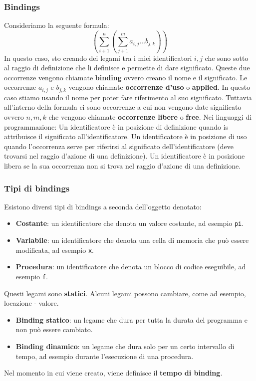 \documentclass[a4paper]{article}
\begin{document}
\subsubsection{Bindings}
Consideriamo la seguente formula:
\[
  \left(\sum_{i+1}^{n}\left(\sum_{j+1}^m a_{i,j} \dots b_{j,k}\right)\right)
\]
In questo caso, sto creando dei legami tra i miei identificatori
\( i, j \) che sono sotto al raggio di definizione che li definisce e 
permette di dare significato. Queste
due occorrenze vengono chiamate \textbf{binding} ovvero creano il nome
e il significato.
Le occorrenze $a_{i,j}$ e $b_{j,k}$ vengono chiamate \textbf{occorrenze 
d'uso} o \textbf{applied}. In questo caso stiamo usando il nome per 
poter fare riferimento al suo significato.
Tuttavia all'interno della formula ci sono occorrenze a cui non vengono date significato
ovvero $n,m,k$ che vengono chiamate \textbf{occorrenze libere} o \textbf{free}.
Nei linguaggi di programmazione:
{
  Un identificatore è in posizione di definizione quando
  is attribuisce il significato all'identificatore.
}
{
  Un identificatore è in posizione di uso quando
  l'occorrenza serve per riferirsi al significato dell'identificatore
  (deve trovarsi nel raggio d'azione di una definizione).
}
{
  Un identificatore è in posizione libera se
  la sua occorrenza non si trova nel raggio d'azione di una definizione.
}

\subsubsection{Tipi di bindings}

Esistono diversi tipi di bindings a seconda dell'oggetto denotato:
\begin{itemize}
  \item \textbf{Costante}: un identificatore che denota un valore costante, ad esempio \texttt{pi}.
  \item \textbf{Variabile}: un identificatore che denota una cella di memoria che può essere modificata, ad esempio \texttt{x}.
  \item \textbf{Procedura}: un identificatore che denota un blocco di codice eseguibile, ad esempio \texttt{f}.
\end{itemize}
Questi legami sono \textbf{statici}.
Alcuni legami possono cambiare, come ad esempio, locazione - valore. 
\begin{itemize}
  \item \textbf{Binding statico}: un legame che dura per tutta la durata del programma e non può essere cambiato.
  \item \textbf{Binding dinamico}: un legame che dura solo per un certo intervallo di tempo, ad esempio durante l'esecuzione 
  di una procedura.
\end{itemize}
Nel momento in cui viene creato, viene definisce il \textbf{tempo di binding}.
\end{document}
